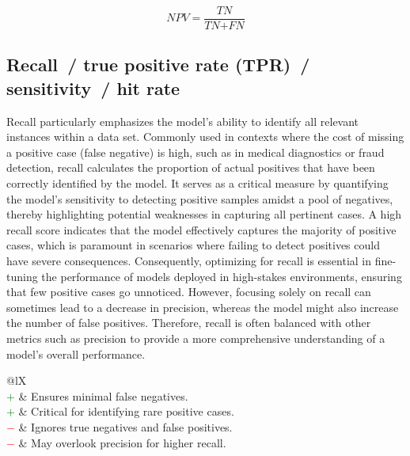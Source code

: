 \documentclass{article}
\begin{document}
\begin{equation}
	\textit{NPV} = \dfrac{\textit{TN}}{\textit{TN} + \textit{FN}}
%
	\label{equation:NPV}
\end{equation}


\subsection[Recall~/ true positive rate (TPR)~/ sensitivity~/ hit rate]{Recall~/ true positive rate (TPR)~/ sensitivity~/ hit rate \cite{yerushalmy1947statistical, altman1994diagnostic}}

Recall \cite{yerushalmy1947statistical, altman1994diagnostic} particularly emphasizes the model's ability to identify all relevant instances within a data set. Commonly used in contexts where the cost of missing a positive case (false negative) is high, such as in medical diagnostics or fraud detection, recall calculates the proportion of actual positives that have been correctly identified by the model. It serves as a critical measure by quantifying the model's sensitivity to detecting positive samples amidst a pool of negatives, thereby highlighting potential weaknesses in capturing all pertinent cases. A high recall score indicates that the model effectively captures the majority of positive cases, which is paramount in scenarios where failing to detect positives could have severe consequences. Consequently, optimizing for recall is essential in fine-tuning the performance of models deployed in high-stakes environments, ensuring that few positive cases go unnoticed. However, focusing solely on recall can sometimes lead to a decrease in precision, whereas the model might also increase the number of false positives. Therefore, recall is often balanced with other metrics such as precision to provide a more comprehensive understanding of a model's overall performance.

\begin{table}[H]\centering
	\begin{tabularx}{\textwidth}{@{}lX}
		 \\
		\textcolor{Green}{$+$} & Ensures minimal false negatives. \\
		\textcolor{Green}{$+$} & Critical for identifying rare positive cases. \\
		\textcolor{Red}{$-$}   & Ignores true negatives and false positives. \\
		\textcolor{Red}{$-$}   & May overlook precision for higher recall.
	\end{tabularx}
\end{table}
\end{document}
